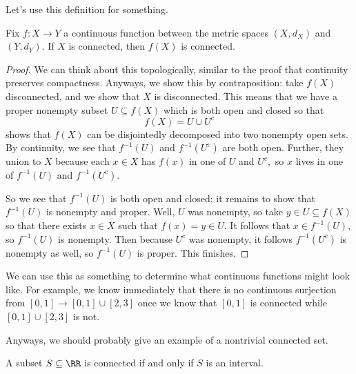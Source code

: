 Let's use this definition for something.
\begin{proposition}
	Fix $f:X\to Y$ a continuous function between the metric spaces $(X,d_X)$ and $(Y,d_Y).$ If $X$ is connected, then $f(X)$ is connected.
\end{proposition}
\begin{proof}
	We can think about this topologically, similar to the proof that continuity preserves compactness. Anyways, we show this by contraposition: take $f(X)$ disconnected, and we show that $X$ is disconnected. This means that we have a proper nonempty subset $U\subseteq f(X)$ which is both open and closed so that
	\[f(X)=U\cup U^c\]
	shows that $f(X)$ can be disjointedly decomposed into two nonempty open sets. By continuity, we see that $f^{-1}(U)$ and $f^{-1}(U^c)$ are both open. Further, they union to $X$ because each $x\in X$ has $f(x)$ in one of $U$ and $U^c,$ so $x$ lives in one of $f^{-1}(U)$ and $f^{-1}(U^c).$

	So we see that $f^{-1}(U)$ is both open and closed; it remains to show that $f^{-1}(U)$ is nonempty and proper. Well, $U$ was nonempty, so take $y\in U\subseteq f(X)$ so that there exists $x\in X$ such that $f(x)=y\in U.$ It follows that $x\in f^{-1}(U),$ so $f^{-1}(U)$ is nonempty. Then because $U^c$ was nonempty, it follows $f^{-1}(U^c)$ is nonempty as well, so $f^{-1}(U)$ is proper. This finishes.
\end{proof}
\begin{remark}
	We can use this as something to determine what continuous functions might look like. For example, we know immediately that there is no continuous surjection from $[0,1]\to[0,1]\cup[2,3]$ once we know that $[0,1]$ is connected while $[0,1]\cup[2,3]$ is not.
\end{remark}
Anyways, we should probably give an example of a nontrivial connected set.
\begin{proposition}
	A subset $S\subseteq\RR$ is connected if and only if $S$ is an interval.
\end{proposition}
